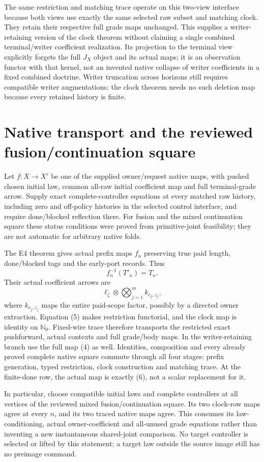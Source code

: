 \documentclass[11pt]{article}\usepackage{amsmath,amssymb,amsthm,geometry}\geometry{margin=1in}\newtheorem{definition}{Definition}\newtheorem{theorem}[definition]{Theorem}\newtheorem{proposition}[definition]{Proposition}
\begin{document}
The same restriction and matching trace operate on this two-view interface because both views use exactly the same selected raw subset and matching clock. They retain their respective full grade maps unchanged. This supplies a writer-retaining version of the clock theorem without claiming a single combined terminal/writer coefficient realization. Its projection to the terminal view explicitly forgets the full $J_X$ object and its actual maps; it is an observation functor with that kernel, not an invented native collapse of writer coefficients in a fixed combined doctrine. Writer truncation across horizons still requires compatible writer augmentations; the clock theorem needs no such deletion map because every retained history is finite.

\section{Native transport and the reviewed fusion/continuation square}
Let $f:X\to X'$ be one of the supplied owner/request native maps, with pushed chosen initial law, common all-raw initial coefficient map and full terminal-grade arrow. Supply exact complete-controller equations at every matched raw history, including zero and off-policy histories in the selected control interface, and require done/blocked reflection there. For fusion and the mixed continuation square these status conditions were proved from primitive-joint feasibility; they are not automatic for arbitrary native folds.

The E4 theorem gives actual prefix maps $f_n$ preserving true paid length, done/blocked tags and the early-port records. Thus
\[
                           f_n^{-1}(T'_n)=T_n.        \tag{5}
\]
Their actual coefficient arrows are
\[
                  \ell_\zeta\otimes\bigotimes_{j=1}^m k_{c_j,z_j}, \tag{6}
\]
where $k_{c_j,z_j}$ maps the entire paid-scope factor, possibly by a directed owner extraction. Equation (5) makes restriction functorial, and the clock map is identity on $\mathbb N_0$. Fixed-wire trace therefore transports the restricted exact pushforward, actual contexts and full grade/body maps. In the writer-retaining branch use the full map (4) as well. Identities, composition and every already proved complete native square commute through all four stages: prefix generation, typed restriction, clock construction and matching trace. At the finite-done row, the actual map is exactly (6), not a scalar replacement for it.

In particular, choose compatible initial laws and complete controllers at all vertices of the reviewed mixed fusion/continuation square. Its two clock-row maps agree at every $n$, and its two traced native maps agree. This consumes its law-conditioning, actual owner-coefficient and all-unused grade equations rather than inventing a new instantaneous shared-joint comparison. No target controller is selected or lifted by this statement; a target law outside the source image still has no preimage command.
\end{document}
